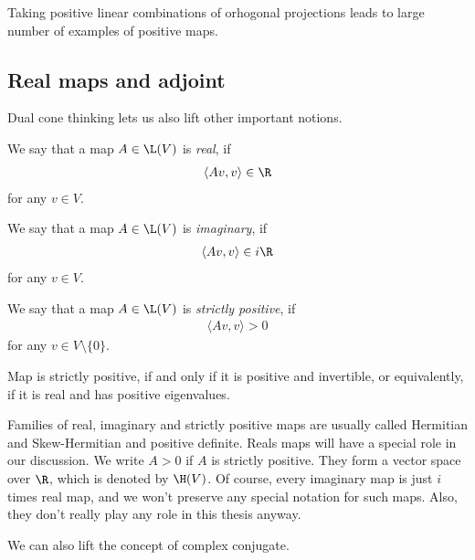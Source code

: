 Taking positive linear combinations of orhogonal projections leads to large number of examples of positive maps.

\subsection{Real maps and adjoint}

Dual cone thinking lets us also lift other important notions.

\begin{maar}
	We say that a map $A \in \L(V)$ is \textit{real}, if
	\begin{align*}
		\langle A v, v \rangle \in \R
	\end{align*}
	for any $v \in V$.
\end{maar}

\begin{maar}
	We say that a map $A \in \L(V)$ is \textit{imaginary}, if
	\begin{align*}
		\langle A v, v \rangle \in i \R
	\end{align*}
	for any $v \in V$.
\end{maar}

\begin{maar}
	We say that a map $A \in \L(V)$ is \textit{strictly positive}, if
	\begin{align*}
		\langle A v, v \rangle > 0
	\end{align*}
	for any $v \in V \setminus \{0\}$.
\end{maar}

Map is strictly positive, if and only if it is positive and invertible, or equivalently, if it is real and has positive eigenvalues.

Families of real, imaginary and strictly positive maps are usually called Hermitian and Skew-Hermitian and positive definite. Reals maps will have a special role in our discussion. We write $A > 0$ if $A$ is strictly positive. They form a vector space over $\R$, which is denoted by $\H(V)$. Of course, every imaginary map is just $i$ times real map, and we won't preserve any special notation for such maps. Also, they don't really play any role in this thesis anyway.

We can also lift the concept of complex conjugate.

